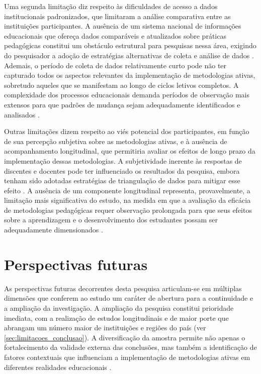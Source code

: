 Uma segunda limitação diz respeito às dificuldades de acesso a dados institucionais padronizados, que limitaram a análise comparativa entre as instituições participantes. A ausência de um sistema nacional de informações educacionais que ofereça dados comparáveis e atualizados sobre práticas pedagógicas constitui um obstáculo estrutural para pesquisas nessa área, exigindo do pesquisador a adoção de estratégias alternativas de coleta e análise de dados \cite{VEIGA2014}. Ademais, o período de coleta de dados relativamente curto pode não ter capturado todos os aspectos relevantes da implementação de metodologias ativas, sobretudo aqueles que se manifestam ao longo de ciclos letivos completos. A complexidade dos processos educacionais demanda períodos de observação mais extensos para que padrões de mudança sejam adequadamente identificados e analisados \cite{BACICH2018}.

Outras limitações dizem respeito ao viés potencial dos participantes, em função de sua percepção subjetiva sobre as metodologias ativas, e à ausência de acompanhamento longitudinal, que permitiria avaliar os efeitos de longo prazo da implementação dessas metodologias. A subjetividade inerente às respostas de discentes e docentes pode ter influenciado os resultados da pesquisa, embora tenham sido adotadas estratégias de triangulação de dados para mitigar esse efeito \cite{SOUSA2025}. A ausência de um componente longitudinal representa, provavelmente, a limitação mais significativa do estudo, na medida em que a avaliação da eficácia de metodologias pedagógicas requer observação prolongada para que seus efeitos sobre a aprendizagem e o desenvolvimento dos estudantes possam ser adequadamente dimensionados \cite{TEODORO2024}.

\section{Perspectivas futuras}
\label{sec:perspectivas_futuras}

As perspectivas futuras decorrentes desta pesquisa articulam-se em múltiplas dimensões que conferem ao estudo um caráter de abertura para a continuidade e a ampliação da investigação. A ampliação da pesquisa constitui prioridade imediata, com a realização de estudos longitudinais e de maior porte que abrangam um número maior de instituições e regiões do país (ver \ref{sec:limitacoes_conclusao}). A diversificação da amostra permite não apenas o fortalecimento da validade externa das conclusões, mas também a identificação de fatores contextuais que influenciam a implementação de metodologias ativas em diferentes realidades educacionais \cite{LIBANEO2006}.

